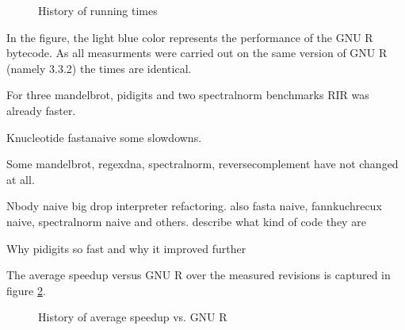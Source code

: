 \begin{figure}[htbp]
  \caption{\label{fig:history}History of running times}
  \centering
\end{figure}

In the figure, the light blue color represents the performance of the GNU R bytecode. As all measurments were carried out on the same version of GNU R (namely 3.3.2) the times are identical.

For three mandelbrot, pidigits and two spectralnorm benchmarks RIR was already faster.

Knucleotide fastanaive some slowdowns.

Some mandelbrot, regexdna, spectralnorm, reversecomplement have not changed at all.

Nbody naive  big drop interpreter refactoring. also fasta naive, fannkuchrecux naive, spectralnorm naive and others. describe what kind of code they are

Why pidigits so fast and why it improved further

The average speedup versus GNU R over the measured revisions is captured in figure \ref{fig:avg-speedup-history}.

\begin{figure}[htbp]
  \caption{\label{fig:avg-speedup-history}History of average speedup vs. GNU R}
  \centering
\end{figure}
